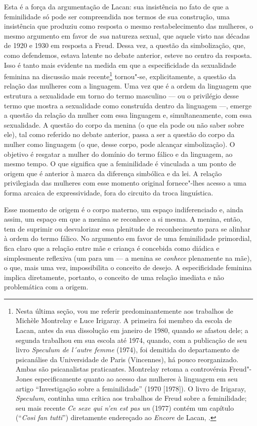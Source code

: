Esta é a força da argumentação de Lacan: sua insistência no fato de que
a feminilidade só pode ser compreendida nos termos de sua construção,
uma insistência que produziu como resposta o mesmo restabelecimento das
mulheres, o mesmo argumento em favor de \emph{sua} natureza sexual, que
aquele visto nas décadas de 1920 e 1930 em resposta a Freud. Dessa vez,
a questão da simbolização, que, como defendemos, estava latente no
debate anterior, esteve no centro da resposta. Isso é tanto mais
evidente na medida em que a especificidade da sexualidade feminina na
discussão mais recente\footnote{Nesta última seção, vou me referir
  predominantemente aos trabalhos de Michèle Montrelay e Luce Irigaray.
  A primeira foi membro da escola de Lacan, antes da sua dissolução em
  janeiro de 1980, quando se afastou dele; a segunda trabalhou em sua
  escola até 1974, quando, com a publicação de seu livro \emph{Speculum
  de l´autre femme} (1974), foi demitida do departamento de psicanálise
  da Universidade de Paris  (Vincennes), há pouco reorganizado.
  Ambas são psicanalistas praticantes. Montrelay retoma a controvérsia
  Freud"-Jones especificamente quanto ao acesso das mulheres à linguagem
  em seu artigo ``Investigação sobre a feminilidade'' (1970 [1978]). O
  livro de Irigaray, \emph{Speculum}, continha uma crítica aos trabalhos
  de Freud sobre a feminilidade; seu mais recente \emph{Ce sexe qui n'en
  est pas un} (1977) contém um capítulo (``\emph{Cosi fan tutti}'')
  diretamente endereçado ao \emph{Encore} de Lacan, .} tornou"-se,
explicitamente, a questão da relação das mulheres com a linguagem. Uma
vez que é a ordem da linguagem que estrutura a sexualidade em torno do
termo masculino --- ou o privilégio desse termo que mostra a sexualidade
como construída dentro da linguagem ---, emerge a questão da relação da
mulher com essa linguagem e, simultaneamente, com essa sexualidade. A
questão do corpo da menina (o que ela pode ou não saber sobre ele), tal
como referido no debate anterior, passa a ser a questão do corpo da
mulher como linguagem (o que, desse corpo, pode alcançar simbolização).
O objetivo é resgatar a mulher do domínio do termo fálico e da
linguagem, ao mesmo tempo. O que significa que a feminilidade é
vinculada a um ponto de origem que é anterior à marca da diferença
simbólica e da lei. A relação privilegiada das mulheres com esse momento
original fornece"-lhes acesso a uma forma arcaica de expressividade, fora
do circuito da troca linguística.

Esse momento de origem é o corpo materno, um espaço indiferenciado e,
ainda assim, um espaço em que a menina se reconhece a si mesma. A
menina, então, tem de suprimir ou desvalorizar essa plenitude de
reconhecimento para se alinhar à ordem do termo fálico. No argumento em
favor de uma feminilidade primordial, fica claro que a relação entre mãe
e criança é concebida como diádica e simplesmente reflexiva (um para um
--- a menina se \emph{conhece} plenamente na mãe), o que, mais uma vez,
impossibilita o conceito de desejo. A especificidade feminina implica
diretamente, portanto, o conceito de uma relação imediata e não
problemática com a origem.

